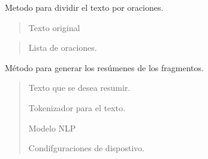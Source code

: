 \documentclass[letterpaper,10pt,english]{sphinxmanual}
\begin{document}
\begin{fulllineitems}
\begin{fulllineitems}
\label{\detokenize{Summarizer:Summarizer.ATSM.generate_sentences}}
\pysigstartsignatures
{}
\pysigstopsignatures
\sphinxAtStartPar
Metodo para dividir el texto por oraciones.
\begin{description}
\begin{quote}\begin{description}
\sphinxAtStartPar
Texto original

\end{description}\end{quote}

\begin{quote}\begin{description}
\sphinxAtStartPar
Lista de oraciones.

\end{description}\end{quote}

\end{description}

\end{fulllineitems}


\begin{fulllineitems}
\label{\detokenize{Summarizer:Summarizer.ATSM.generate_summary}}
\pysigstartsignatures
{}
\pysigstopsignatures
\sphinxAtStartPar
Método para generar los resúmenes de los fragmentos.
\begin{description}
\begin{quote}\begin{description}
\sphinxAtStartPar
Texto que se desea resumir.

\sphinxAtStartPar
Tokenizador para el texto.

\sphinxAtStartPar
Modelo NLP

\sphinxAtStartPar
Condifguraciones de dispostivo.


\end{description}
\end{quote}
\end{description}
\end{fulllineitems}
\end{fulllineitems}
\end{document}
